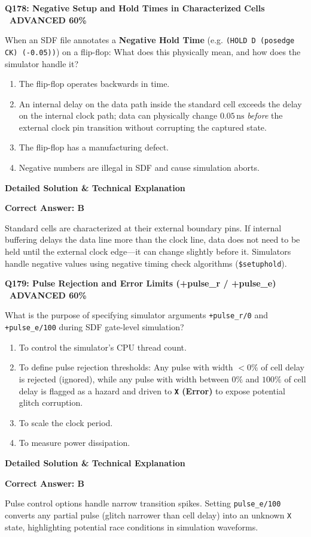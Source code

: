 \documentclass[11pt,a4paper]{article}
\newcommand{\badgeadv}{{\color{white}\colorbox{advred}{\bfseries\sffamily\tiny\ ADVANCED 60\%\ }}}
\newenvironment{qbox}[2]{%
  \begin{mdframed}[style=qstyle]%
  {\bfseries\sffamily\color{primaryblue}#1 \hfill #2}\par\vspace{2pt}%
}{%
  \end{mdframed}%
}
\newenvironment{ansbox}{%
  \begin{mdframed}[style=ansstyle]%
  {\bfseries\sffamily\color{ansgreen}\small Detailed Solution \& Technical Explanation}\par\vspace{2pt}\small%
}{%
  \end{mdframed}%
}
\begin{document}
\begin{qbox}{Q178: Negative Setup and Hold Times in Characterized Cells}{\badgeadv}
When an SDF file annotates a \textbf{Negative Hold Time} (e.g. \texttt{(HOLD D (posedge CK) (-0.05))}) on a flip-flop:
What does this physically mean, and how does the simulator handle it?
\begin{enumerate}[label=\textbf{\Alph*.}]
  \item The flip-flop operates backwards in time.
  \item An internal delay on the data path inside the standard cell exceeds the delay on the internal clock path; data can physically change $0.05\,\text{ns}$ \textit{before} the external clock pin transition without corrupting the captured state.
  \item The flip-flop has a manufacturing defect.
  \item Negative numbers are illegal in SDF and cause simulation aborts.
\end{enumerate}
\end{qbox}
\begin{ansbox}
\textbf{Correct Answer: B}

Standard cells are characterized at their external boundary pins. If internal buffering delays the data line more than the clock line, data does not need to be held until the external clock edge---it can change slightly before it. Simulators handle negative values using negative timing check algorithms (\texttt{\$setuphold}).
\end{ansbox}

\begin{qbox}{Q179: Pulse Rejection and Error Limits (+pulse\_r / +pulse\_e)}{\badgeadv}
What is the purpose of specifying simulator arguments \texttt{+pulse\_r/0} and \texttt{+pulse\_e/100} during SDF gate-level simulation?
\begin{enumerate}[label=\textbf{\Alph*.}]
  \item To control the simulator's CPU thread count.
  \item To define pulse rejection thresholds: Any pulse with width $< 0\%$ of cell delay is rejected (ignored), while any pulse with width between $0\%$ and $100\%$ of cell delay is flagged as a hazard and driven to \textbf{\texttt{X} (Error)} to expose potential glitch corruption.
  \item To scale the clock period.
  \item To measure power dissipation.
\end{enumerate}
\end{qbox}
\begin{ansbox}
\textbf{Correct Answer: B}

Pulse control options handle narrow transition spikes. Setting \texttt{pulse\_e/100} converts any partial pulse (glitch narrower than cell delay) into an unknown \texttt{X} state, highlighting potential race conditions in simulation waveforms.
\end{ansbox}
\end{document}
